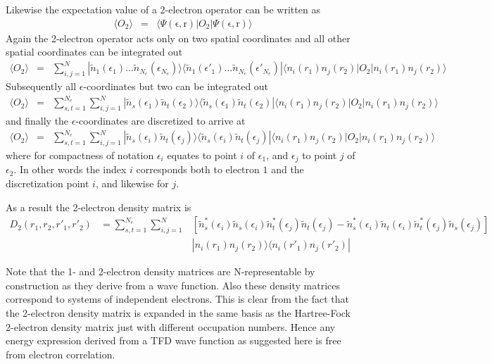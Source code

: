 \documentclass[aip,graphicx]{revtex4-1}
\begin{document}
\begin{itemize}
    Likewise the expectation value of a 2-electron operator can be written as
    \begin{eqnarray}
    \langle O_2\rangle &=& \langle\Psi(\mathrm{\epsilon},\mathrm{r})|O_2|\Psi(\mathrm{\epsilon},\mathrm{r})\rangle
    \end{eqnarray}
    Again the 2-electron operator acts only on two spatial coordinates and all other spatial coordinates can be integrated out
    \begin{eqnarray}
    \langle O_2\rangle &=&
    \sum_{i,j=1}^{N}|\tilde{n}_1(\epsilon_1)\ldots\tilde{n}_{N_e}(\epsilon_{N_e})\rangle\langle\tilde{n}_1(\epsilon'_1)\ldots\tilde{n}_{N_e}(\epsilon'_{N_e})|\langle n_i(r_1)n_j(r_2)|O_2|n_i(r_1)n_j(r_2)\rangle
    \end{eqnarray}
    Subsequently all $\epsilon$-coordinates but two can be integrated out
    \begin{eqnarray}
    \langle O_2\rangle &=&
    \sum_{s,t=1}^{N_e}\sum_{i,j=1}^{N}|\tilde{n}_s(\epsilon_1)\tilde{n}_t(\epsilon_2)\rangle\langle\tilde{n}_s(\epsilon_1)\tilde{n}_t(\epsilon_2)|
    \langle n_i(r_1)n_j(r_2)|O_2|n_i(r_1)n_j(r_2)\rangle
    \end{eqnarray}
    and finally the $\epsilon$-coordinates are discretized to arrive at
    \begin{eqnarray}
    \langle O_2\rangle &=&
    \sum_{s,t=1}^{N_e}\sum_{i,j=1}^{N}|\tilde{n}_s(\epsilon_i)\tilde{n}_t(\epsilon_j)\rangle\langle\tilde{n}_s(\epsilon_i)\tilde{n}_t(\epsilon_j)|
    \langle n_i(r_1)n_j(r_2)|O_2|n_i(r_1)n_j(r_2)\rangle
    \end{eqnarray}
    where for compactness of notation $\epsilon_i$ equates to point $i$ of $\epsilon_1$, and $\epsilon_j$ to point $j$ of $\epsilon_2$. In other words the index $i$ corresponds both to electron $1$ and the discretization point $i$, and likewise for $j$.

    As a result the 2-electron density matrix is
    \begin{eqnarray}
    \label{Eq:D2}
    D_2(r_1,r_2,r'_1,r'_2) 
    &=  \sum_{s,t=1}^{N_e}\sum_{i,j=1}^N &
        \left[
        \tilde{n}_s^*(\epsilon_i)\tilde{n}_s(\epsilon_i)\tilde{n}_t^*(\epsilon_j)\tilde{n}_t(\epsilon_j)-\tilde{n}_s^*(\epsilon_i)\tilde{n}_t(\epsilon_i)\tilde{n}_t^*(\epsilon_j)\tilde{n}_s(\epsilon_j)
        \right] \nonumber \\
    &&  |n_i(r_1)n_j(r_2)\rangle\langle n_i(r'_1)n_j(r'_2)|
    \end{eqnarray}
    
    Note that the 1- and 2-electron density matrices are N-representable by construction as they derive from a wave function. Also these density matrices correspond to systems of independent electrons. This is clear from the fact that the 2-electron density matrix is expanded in the same basis as the Hartree-Fock 2-electron density matrix just with different occupation numbers. Hence any energy expression derived from a TFD wave function as suggested here is free from electron correlation. 
    

\end{itemize}
\end{document}
